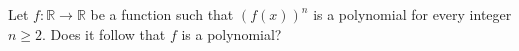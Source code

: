 Let \(f \colon \mathbb{R} \to \mathbb{R}\) be a function such that  \((f(x))^{n}\) is a polynomial for every integer \(n\geq 2\). Does it follow that \(f\) is a polynomial?